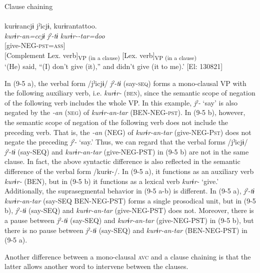   \ex\label{ex:9.5b} Clause chaining\\\\
 \gllll  kurɨrancjɨ  jˀicjɨ,  kurɨrantattoo.\\
    \textit{kurɨr-an=ccjɨ}  \textit{jˀ-tɨ}  \textit{kurɨr--tar=doo}\\
    [give-\textsc{neg}=\textsc{qt}  say-\textsc{seq}]  [give-NEG-\textsc{pst}=\textsc{ass}]\\
    {[Complement}  {Lex. verb]\textsubscript{VP (in a clause)}}  {[Lex. verb]\textsubscript{VP (in a clause)}}\\
    \glt     ‘(He) said, “(I) don’t give (it),” and didn’t give (it to me).’ [El: 130821]
\z
\z

In (9-5 a), the verbal form /jˀicjɨ/ \textit{jˀ-tɨ} (say-\textsc{seq}) forms a mono-clausal VP with the following auxiliary verb, i.e. \textit{kurɨr-} (\textsc{ben}), since the semantic scope of negation of the following verb includes the whole VP. In this example, \textit{jˀ-} ‘say’ is also negated by the \textit{{}-an} (\textsc{neg}) of \textit{kurɨr-an-tar} (BEN-NEG-\textsc{pst}). In (9-5 b), however, the semantic scope of negation of the following verb does not include the preceding verb. That is, the \textit{{}-an} (NEG) of \textit{kurɨr-an-tar} (give-NEG-P\textsc{st}) does not negate the preceding \textit{jˀ-} ‘say.’ Thus, we can regard that the verbal forms /jˀicjɨ/ \textit{jˀ-tɨ} (say-SEQ) and \textit{kurɨr-an-tar} (give-NEG-PST) in (9-5 b) are not in the same clause. In fact, the above syntactic difference is also reflected in the semantic difference of the verbal form /kurɨr-/. In (9-5 a), it functions as an auxiliary verb \textit{kurɨr-} (BEN), but in (9-5 b) it functions as a lexical verb \textit{kurɨr-} ‘give.’ Additionally, the suprasegmental behavior in (9-5 a-b) is different. In (9-5 a), \textit{jˀ-tɨ} \textit{kurɨr-an-tar} (say-SEQ BEN-NEG-PST) forms a single prosodical unit, but in (9-5 b), \textit{jˀ-tɨ} (say-SEQ) and \textit{kurɨr-an-tar} (give-NEG-PST) does not. Moreover, there is a pause between \textit{jˀ-tɨ} (say-SEQ) and \textit{kurɨr-an-tar} (give-NEG-PST) in (9-5 b), but there is no pause between \textit{jˀ-tɨ} (say-SEQ) and \textit{kurɨr-an-tar} (BEN-NEG-PST) in (9-5 a).

Another difference between a mono-clausal \textsc{avc} and a clause chaining is that the latter allows another word to intervene between the clauses.

